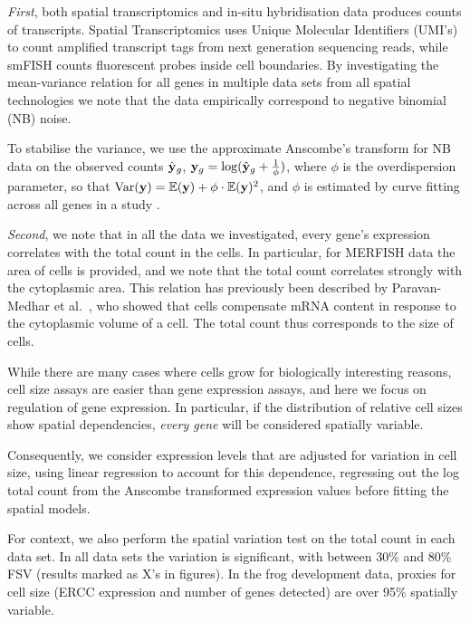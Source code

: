 \textit{First}, both spatial transcriptomics and in-situ hybridisation data produces counts of transcripts. Spatial Transcriptomics uses Unique Molecular Identifiers (UMI's) to count amplified transcript tags from next generation sequencing reads, while smFISH counts fluorescent probes inside cell boundaries. By investigating the mean-variance relation for all genes in multiple data sets from all spatial technologies we note that the data empirically correspond to negative binomial (NB) noise.

To stabilise the variance, we use the approximate Anscombe's transform for NB data on the observed counts \( \hat{{\bf y}}_g \), \( {\bf y}_g = \log(\hat{{\bf y}}_g + \frac{1}{\phi}) \), where \( \phi \) is the overdispersion parameter, so that \( \text{Var}({\bf y}) = \mathbb{E}({\bf y}) + \phi \cdot \mathbb{E}({\bf y})^2 \), and \( \phi \) is estimated by curve fitting across all genes in a study \cite{Anscombe1948-uw}.

\textit{Second}, we note that in all the data we investigated, every gene's expression correlates with the total count in the cells. In particular, for MERFISH data the area of cells is provided, and we note that the total count correlates strongly with the cytoplasmic area.  This relation has previously been described by Paravan-Medhar et al.~\cite{Padovan-Merhar2015-ne}, who showed that cells compensate mRNA content in response to the cytoplasmic volume of a cell. The total count thus corresponds to the size of cells.

While there are many cases where cells grow for biologically interesting reasons, cell size assays are easier than gene expression assays, and here we focus on regulation of gene expression.  In particular, if the distribution of relative cell sizes show spatial dependencies, \emph{every gene} will be considered spatially variable.

Consequently, we consider expression levels that are adjusted for variation in cell size, using linear regression to account for this dependence, regressing out the log total count from the Anscombe transformed expression values before fitting the spatial models.

For context, we also perform the spatial variation test on the total count in each data set. In all data sets the variation is significant, with between 30\% and 80\% FSV (results marked as X's in figures). In the frog development data, proxies for cell size (ERCC expression and number of genes detected) are over 95\% spatially variable.

